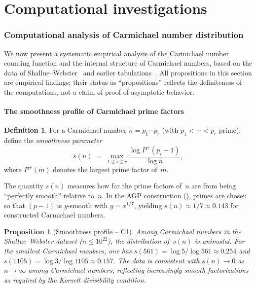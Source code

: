 \documentclass[12pt]{amsart}
\theoremstyle{plain}
\newtheorem{proposition}[theorem]{Proposition}
\theoremstyle{definition}
\newtheorem{definition}[theorem]{Definition}
\theoremstyle{remark}
\newcommand{\Pp}{P^{+}}
\begin{document}

\part{Computational investigations}\label{part:computation}

\section{Computational analysis of Carmichael number distribution}
\label{sec:computation}

We now present a systematic empirical analysis of the Carmichael
number counting function and the internal structure of Carmichael
numbers, based on the data of
Shallue--Webster~\cite{shalluewebster2024} and earlier
tabulations~\cite{psw1980}.  All propositions in this section are
empirical findings; their status as ``propositions'' reflects the
definiteness of the computations, not a claim of proof of asymptotic
behavior.

\subsection{The smoothness profile of Carmichael prime factors}
\label{subsec:C1}

\begin{definition}\label{def:smoothness}
For a Carmichael number $n=p_{1}\cdots p_{r}$ (with $p_{1}<\cdots <p_{r}$
prime), define the \emph{smoothness parameter}
\[
  s(n) \;=\;
  \max_{1\le i\le r}\frac{\log \Pp(p_{i}-1)}{\log n},
\]
where $\Pp(m)$ denotes the largest prime factor of~$m$.
\end{definition}

The quantity $s(n)$ measures how far the prime factors of~$n$ are
from being ``perfectly smooth'' relative to~$n$.  In the AGP
construction (), primes are chosen so that
$(p-1)$ is $y$-smooth with $y=x^{1/7}$, yielding $s(n)\approx 1/7
\approx 0.143$ for constructed Carmichael numbers.

\begin{proposition}[Smoothness profile -- C1]\label{prop:C1}
Among Carmichael numbers in the Shallue--Webster dataset ($n\le
10^{22}$), the distribution of~$s(n)$ is unimodal.  For the smallest
Carmichael numbers, one has $s(561)=\log 5/\log 561\approx 0.254$
and $s(1105)=\log 3/\log 1105\approx 0.157$.  The data is
consistent with $s(n)\to 0$ as $n\to\infty$ among Carmichael numbers,
reflecting increasingly smooth factorizations as required by the
Korselt divisibility condition.
\end{proposition}
\end{document}
